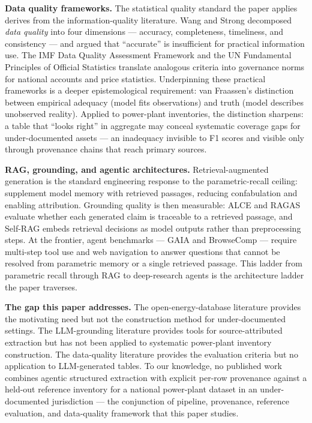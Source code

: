 \documentclass[a4paper,11pt]{article}
\begin{document}
\textbf{Data quality frameworks.} The statistical quality standard the
paper applies derives from the information-quality literature. Wang and
Strong \citeyearpar{Wang-Richard1996:beyond-accuracy} decomposed
\emph{data quality} into four dimensions --- accuracy, completeness,
timeliness, and consistency --- and argued that ``accurate'' is
insufficient for practical information use. The IMF Data Quality
Assessment Framework \citep{IMF2003:dqaf} and the UN Fundamental
Principles of Official Statistics \citep{UN2014:fundamental-principles}
translate analogous criteria into governance norms for national accounts
and price statistics. Underpinning these practical frameworks is a
deeper epistemological requirement: van Fraassen's
\citeyearpar{vanFraassen1980:scientific-image} distinction between
empirical adequacy (model fits observations) and truth (model describes
unobserved reality). Applied to power-plant inventories, the distinction
sharpens: a table that ``looks right'' in aggregate may conceal
systematic coverage gaps for under-documented assets --- an inadequacy
invisible to F1 scores and visible only through provenance chains that
reach primary sources.

\textbf{RAG, grounding, and agentic architectures.} Retrieval-augmented
generation \citep{Lewis-Patrick2020:rag, Gao-Yunfan2024:rag-survey} is
the standard engineering response to the parametric-recall ceiling:
supplement model memory with retrieved passages, reducing confabulation
and enabling attribution. Grounding quality is then measurable: ALCE
\citep{Gao-Tianyu2023:alce} and RAGAS \citep{Es-Shahul2023:ragas}
evaluate whether each generated claim is traceable to a retrieved
passage, and Self-RAG \citep{Asai-Akari2024:self-rag} embeds retrieval
decisions as model outputs rather than preprocessing steps. At the
frontier, agent benchmarks --- GAIA \citep{Mialon-Gregoire2024:gaia} and
BrowseComp \citep{Wei-Jason2025:browsecomp} --- require multi-step tool
use and web navigation to answer questions that cannot be resolved from
parametric memory or a single retrieved passage. This ladder from
parametric recall through RAG to deep-research agents is the
architecture ladder the paper traverses.

\textbf{The gap this paper addresses.} The open-energy-database
literature provides the motivating need but not the construction method
for under-documented settings. The LLM-grounding literature provides
tools for source-attributed extraction but has not been applied to
systematic power-plant inventory construction. The data-quality
literature provides the evaluation criteria but no application to
LLM-generated tables. To our knowledge, no published work combines
agentic structured extraction with explicit per-row provenance against a
held-out reference inventory for a national power-plant dataset in an
under-documented jurisdiction --- the conjunction of pipeline,
provenance, reference evaluation, and data-quality framework that this
paper studies.
\end{document}
